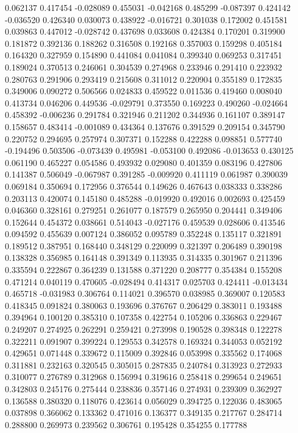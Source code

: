 0.062137
0.417454
-0.028089
0.455031
-0.042168
0.485299
-0.087397
0.424142
-0.036520
0.426340
0.030073
0.438922
-0.016721
0.301038
0.172002
0.451581
0.039863
0.447012
-0.028742
0.437698
0.033608
0.424384
0.170201
0.319900
0.181872
0.392136
0.188262
0.316508
0.192168
0.357003
0.159298
0.405184
0.164320
0.327959
0.154890
0.441084
0.041084
0.399340
0.069253
0.317451
0.189024
0.370513
0.246061
0.304539
0.274968
0.233946
0.291410
0.223932
0.280763
0.291906
0.293419
0.215608
0.311012
0.220904
0.355189
0.172835
0.349006
0.090272
0.506566
0.024833
0.459522
0.011536
0.419460
0.008040
0.413734
0.046206
0.449536
-0.029791
0.373550
0.169223
0.490260
-0.024664
0.458392
-0.006236
0.291784
0.321946
0.211202
0.344936
0.161107
0.389147
0.158657
0.483414
-0.001089
0.434364
0.137676
0.391529
0.209154
0.345790
0.220752
0.294695
0.257974
0.307371
0.152288
0.422288
0.098851
0.577740
-0.194496
0.503506
-0.073439
0.495981
-0.053100
0.492086
-0.013653
0.430125
0.061190
0.465227
0.054586
0.493932
0.029080
0.401359
0.083196
0.427806
0.141387
0.506049
-0.067987
0.391285
-0.009920
0.411119
0.061987
0.390039
0.069184
0.350694
0.172956
0.376544
0.149626
0.467643
0.038333
0.338286
0.203113
0.420074
0.145180
0.485288
-0.019920
0.492016
0.002693
0.425459
0.046360
0.328161
0.279251
0.261077
0.187579
0.265950
0.204441
0.349406
0.152644
0.454372
0.038661
0.514043
-0.027176
0.459539
0.028606
0.413546
0.094592
0.455639
0.007124
0.386052
0.095789
0.352248
0.135117
0.321891
0.189512
0.387951
0.168440
0.348129
0.220099
0.321397
0.206489
0.390198
0.138328
0.356985
0.164148
0.391349
0.113935
0.314335
0.301967
0.211396
0.335594
0.222867
0.364239
0.131588
0.371220
0.208777
0.354384
0.155208
0.471214
0.040119
0.470605
-0.028494
0.414317
0.025703
0.424411
-0.013434
0.465718
-0.031983
0.306764
0.114021
0.396570
0.038985
0.369007
0.120583
0.418345
0.091824
0.380063
0.193696
0.376767
0.206429
0.383011
0.193488
0.394964
0.100120
0.385310
0.107358
0.422754
0.105206
0.336863
0.229467
0.249207
0.274925
0.262291
0.259421
0.273998
0.190528
0.398348
0.122278
0.322211
0.091907
0.399224
0.129553
0.342578
0.169324
0.344053
0.052192
0.429651
0.071448
0.339672
0.115009
0.392846
0.053998
0.335562
0.174068
0.311881
0.232163
0.320545
0.305015
0.287835
0.240784
0.313923
0.272933
0.310077
0.276789
0.312968
0.156994
0.319616
0.258418
0.299654
0.249651
0.342803
0.245176
0.275444
0.238836
0.357146
0.274931
0.239309
0.362927
0.136588
0.380320
0.118076
0.423614
0.056029
0.394725
0.122036
0.483065
0.037898
0.366062
0.133362
0.471016
0.136377
0.349135
0.217767
0.284714
0.288800
0.269973
0.239562
0.306761
0.195428
0.354255
0.177788
